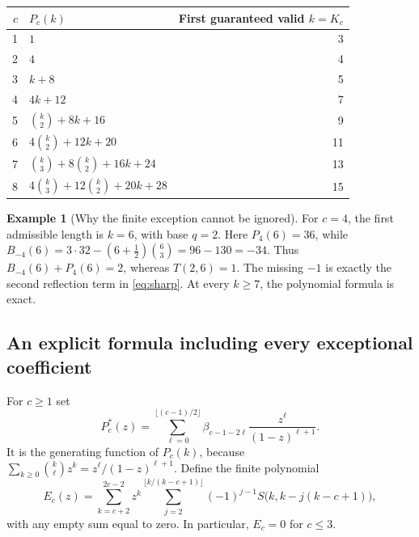 \documentclass[11pt,letterpaper]{article}
\numberwithin{equation}{section}
\theoremstyle{definition}
\newtheorem{example}[theorem]{Example}
\begin{document}
\begin{center}
\begin{tabular}{r l r}
\toprule
$c$ & $P_c(k)$ & First guaranteed valid $k=K_c$ \\
\midrule
1 & $1$ & 3 \\
2 & $4$ & 4 \\
3 & $k+8$ & 5 \\
4 & $4k+12$ & 7 \\
5 & $\binom{k}{2}+8k+16$ & 9 \\
6 & $4\binom{k}{2}+12k+20$ & 11 \\
7 & $\binom{k}{3}+8\binom{k}{2}+16k+24$ & 13 \\
8 & $4\binom{k}{3}+12\binom{k}{2}+20k+28$ & 15 \\
\bottomrule
\end{tabular}
\end{center}

\begin{example}[Why the finite exception cannot be ignored]
For $c=4$, the first admissible length is $k=6$, with base $q=2$.
Here $P_4(6)=36$, while
$B_{-4}(6)=3\cdot32-(6+\tfrac12)\binom63=96-130=-34$.
Thus $B_{-4}(6)+P_4(6)=2$, whereas $T(2,6)=1$.
The missing $-1$ is exactly the second reflection term in
\eqref{eq:sharp}.  At every $k\ge7$, the polynomial formula is exact.
\end{example}

\subsection{An explicit formula including every exceptional coefficient}
For $c\ge1$ set
\begin{equation}\label{eq:Pg}
P_c^*(z)=\sum_{\ell=0}^{\lfloor(c-1)/2\rfloor}
\beta_{c-1-2\ell}\frac{z^\ell}{(1-z)^{\ell+1}}.
\end{equation}
It is the generating function of $P_c(k)$, because
$\sum_{k\ge0}\binom{k}{\ell}z^k=z^\ell/(1-z)^{\ell+1}$.
Define the finite polynomial
\begin{equation}\label{eq:Ec}
E_c(z)=\sum_{k=c+2}^{2c-2}z^k
\sum_{j=2}^{\lfloor k/(k-c+1)\rfloor}
(-1)^{j-1}S\bigl(k,k-j(k-c+1)\bigr),
\end{equation}
with any empty sum equal to zero.  In particular, $E_c=0$ for $c\le3$.
\end{document}
